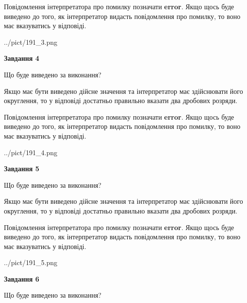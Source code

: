 \documentclass[12pt, ukrainian]{article}
\begin{document}
{\begin {Large}
Повідомлення інтерпретатора про помилку позначати \textbf{error}.
Якщо щось буде виведено до того, як інтерпретатор видасть повідомлення про помилку, 
то воно має вказуватись у відповіді. \par

\begin{center}
	{../pict/191_3.png}
\end{center}
\newpage

{\begin {center}\textbf{Завдання 4}\end {center}}\par
Що буде виведено за виконання? \par

Якщо має бути виведено дійсне значення та інтерпретатор має здійснювати його округлення, 
то у відповіді достатньо правильно вказати два дробових розряди.

Повідомлення інтерпретатора про помилку позначати \textbf{error}.
Якщо щось буде виведено до того, як інтерпретатор видасть повідомлення про помилку, 
то воно має вказуватись у відповіді. \par

\begin{center}
	{../pict/191_4.png}
\end{center}
\newpage

{\begin {center}\textbf{Завдання 5}\end {center}}\par
Що буде виведено за виконання? \par

Якщо має бути виведено дійсне значення та інтерпретатор має здійснювати його округлення, 
то у відповіді достатньо правильно вказати два дробових розряди.

Повідомлення інтерпретатора про помилку позначати \textbf{error}.
Якщо щось буде виведено до того, як інтерпретатор видасть повідомлення про помилку, 
то воно має вказуватись у відповіді. \par

\begin{center}
	{../pict/191_5.png}
\end{center}
\newpage

{\begin {center}\textbf{Завдання 6}\end {center}}\par
Що буде виведено за виконання? \par


\end{Large}}
\end{document}
